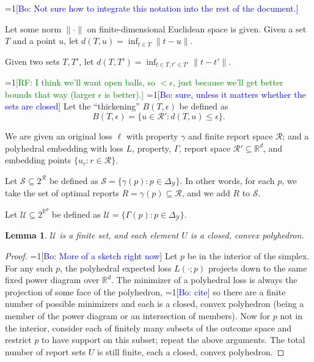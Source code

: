 \documentclass{article}
\newcommand{\Comments}{1}
\newcommand{\mynote}[2]{\ifnum\Comments=1\textcolor{#1}{#2}\fi}
\newcommand{\raf}[1]{\mynote{green}{[RF: #1]}}
\newcommand{\bo}[1]{\mynote{blue}{[Bo: #1]}}
\newcommand{\reals}{\mathbb{R}}
\newcommand{\R}{\mathcal{R}}
\newcommand{\Y}{\mathcal{Y}}
\newtheorem{lemma}{Lemma}
\begin{document}
\bo{Not sure how to integrate this notation into the rest of the document.}

Let some norm $\|\cdot\|$ on finite-dimensional Euclidean space is given.
Given a set $T$ and a point $u$, let $d(T,u) = \inf_{t \in T} \|t-u\|$.

Given two sets $T,T'$, let $d(T,T') = \inf_{t\in T, t' \in T'} \|t-t'\|$.

\raf{I think we'll want open balls, so $< \epsilon$, just because we'll get better bounds that way (larger $\epsilon$ is better).} \bo{sure, unless it matters whether the sets are closed}
Let the ``thickening'' $B(T,\epsilon)$ be defined as
  \[ B(T,\epsilon) = \{u \in \R' : d(T,u) \leq \epsilon \} . \]

We are given an original loss $\ell$ with property $\gamma$ and finite report space $\R$; and a polyhedral embedding with loss $L$, property, $\Gamma$, report space $\R' \subseteq \reals^d$, and embedding points $\{u_r : r \in \R\}$.


Let $\mathcal{S} \subseteq 2^{\R}$ be defined as $\mathcal{S} = \{\gamma(p) : p \in \Delta_{\Y}\}$.
In other words, for each $p$, we take the set of optimal reports $R = \gamma(p) \subseteq \R$, and we add $R$ to $\mathcal{S}$.

Let $\mathcal{U} \subseteq 2^{\reals^d}$ be defined as $\mathcal{U} = \{\Gamma(p) : p \in \Delta_{\Y}\}$.

\begin{lemma} \label{lemma:U-convex-closed}
  $\mathcal{U}$ is a finite set, and each element $U$ is a closed, convex polyhedron.
\end{lemma}
\begin{proof}
  \bo{More of a sketch right now}
  Let $p$ be in the interior of the simplex.
  For any such $p$, the polyhedral expected loss $L(\cdot;p)$ projects down to the same fixed power diagram over $\reals^d$.
  The minimizer of a polyhedral loss is always the projection of some face of the polyhedron, \bo{cite} so there are a finite number of possible minimizers and each is a closed, convex polyhedron (being a member of the power diagram or an intersection of members).
  Now for $p$ not in the interior, consider each of finitely many subsets of the outcome space and restrict $p$ to have support on this subset; repeat the above arguments.
  The total number of report sets $U$ is still finite, each a closed, convex polyhedron.
\end{proof}
\end{document}
